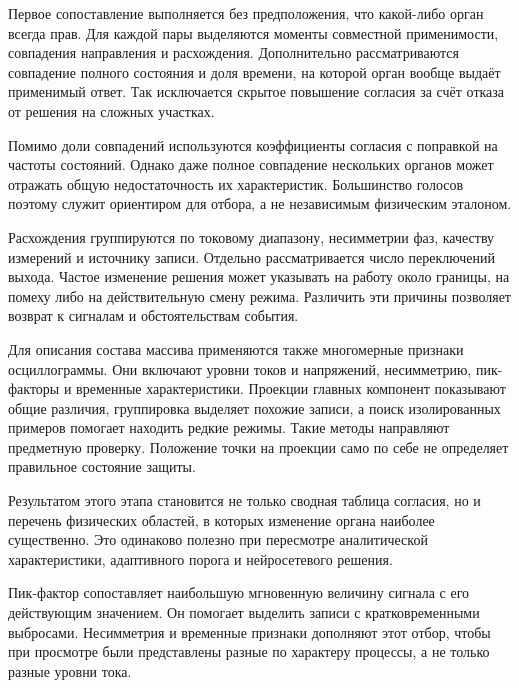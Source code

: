 Первое сопоставление выполняется без предположения,
что какой-либо орган всегда прав.
Для каждой пары выделяются моменты совместной
применимости, совпадения направления и расхождения.
Дополнительно рассматриваются совпадение полного
состояния и доля времени, на которой орган вообще
выдаёт применимый ответ.
Так исключается скрытое повышение согласия за счёт
отказа от решения на сложных участках.

Помимо доли совпадений используются коэффициенты
согласия с поправкой на частоты состояний.
Однако даже полное совпадение нескольких органов
может отражать общую недостаточность их характеристик.
Большинство голосов поэтому служит ориентиром для отбора,
а не независимым физическим эталоном.

Расхождения группируются по токовому диапазону,
несимметрии фаз, качеству измерений и источнику записи.
Отдельно рассматривается число переключений выхода.
Частое изменение решения может указывать на работу
около границы, на помеху либо на действительную
смену режима. Различить эти причины позволяет
возврат к сигналам и обстоятельствам события.

Для описания состава массива применяются также
многомерные признаки осциллограммы.
Они включают уровни токов и напряжений,
несимметрию, пик-факторы и временные характеристики.
Проекции главных компонент показывают общие различия,
группировка выделяет похожие записи, а поиск
изолированных примеров помогает находить редкие режимы.
Такие методы направляют предметную проверку.
Положение точки на проекции само по себе
не определяет правильное состояние защиты.

Результатом этого этапа становится не только сводная
таблица согласия, но и перечень физических областей,
в которых изменение органа наиболее существенно.
Это одинаково полезно при пересмотре аналитической
характеристики, адаптивного порога и нейросетевого решения.

{}

Пик-фактор сопоставляет наибольшую мгновенную величину сигнала
с его действующим значением. Он помогает выделить записи
с кратковременными выбросами. Несимметрия и временные признаки
дополняют этот отбор, чтобы при просмотре были представлены
разные по характеру процессы, а не только разные уровни тока.

{}

